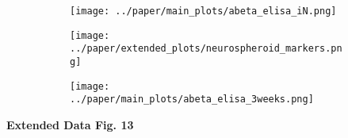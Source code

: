 \begin{figure}[H]
    \begin{subfigure}[t]{0.5\textwidth}
        \caption{}
        \texttt{[image: ../paper/main\_plots/abeta\_elisa\_iN.png]}        
    \end{subfigure}  
    \par
    \begin{subfigure}[t]{0.7\textwidth}
        \caption{}
        \texttt{[image: ../paper/extended\_plots/neurospheroid\_markers.png]}        
    \end{subfigure}
    \par
    \begin{subfigure}[t]{0.7\textwidth}
        \caption{}
        \texttt{[image: ../paper/main\_plots/abeta\_elisa\_3weeks.png]}        
    \end{subfigure}
\end{figure}
\textbf{Extended Data Fig. 13}